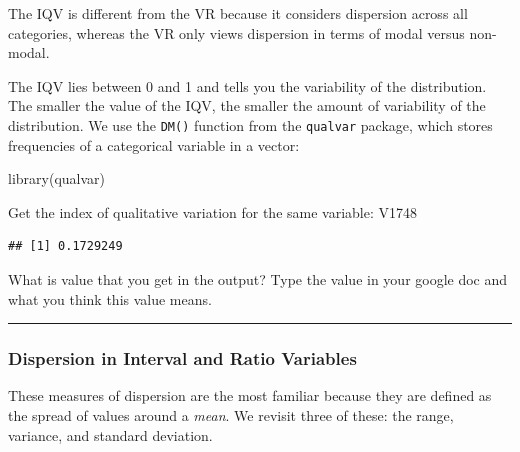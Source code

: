 \documentclass[
]{book}
\newenvironment{Shaded}{\begin{snugshade}}{\end{snugshade}}
\newcommand{\AttributeTok}[1]{\textcolor[rgb]{0.77,0.63,0.00}{#1}}
\newcommand{\CommentTok}[1]{\textcolor[rgb]{0.56,0.35,0.01}{\textit{#1}}}
\newcommand{\ConstantTok}[1]{\textcolor[rgb]{0.00,0.00,0.00}{#1}}
\newcommand{\FunctionTok}[1]{\textcolor[rgb]{0.00,0.00,0.00}{#1}}
\newcommand{\NormalTok}[1]{#1}
\newcommand{\OtherTok}[1]{\textcolor[rgb]{0.56,0.35,0.01}{#1}}
\newcommand{\SpecialCharTok}[1]{\textcolor[rgb]{0.00,0.00,0.00}{#1}}
\begin{document}
The IQV is different from the VR because it considers dispersion across all categories, whereas the VR only views dispersion in terms of modal versus non-modal.

The IQV lies between 0 and 1 and tells you the variability of the distribution. The smaller the value of the IQV, the smaller the amount of variability of the distribution. We use the \texttt{DM()} function from the \texttt{qualvar} package, which stores frequencies of a categorical variable in a vector:

\begin{Shaded}
\begin{Highlighting}[]
\FunctionTok{library}\NormalTok{(qualvar)}
\end{Highlighting}
\end{Shaded}

Get the index of qualitative variation for the same variable: V1748

\begin{Shaded}
\end{Shaded}

\begin{verbatim}
## [1] 0.1729249
\end{verbatim}

What is value that you get in the output? Type the value in your google doc and what you think this value means.

\begin{center}\rule{0.5\linewidth}{0.5pt}\end{center}

\hypertarget{dispersion-in-interval-and-ratio-variables}{%
\subsubsection{\texorpdfstring{\textbf{Dispersion in Interval and Ratio Variables}}{Dispersion in Interval and Ratio Variables}}\label{dispersion-in-interval-and-ratio-variables}}

These measures of dispersion are the most familiar because they are defined as the spread of values around a \emph{mean}. We revisit three of these: the range, variance, and standard deviation.
\end{document}
